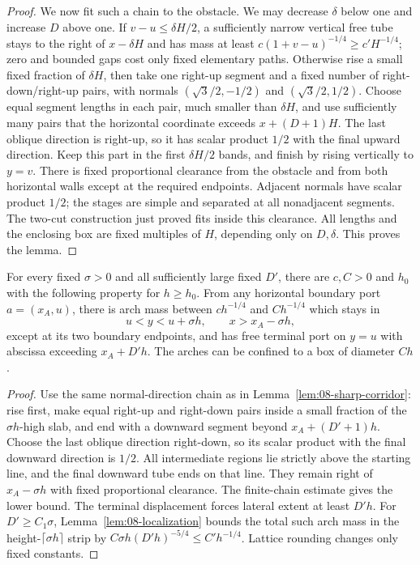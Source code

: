 \begin{proof}
We now fit such a chain to the obstacle. We may decrease $\delta$ below
one and increase $D$ above one. If $v-u\le\delta H/2$, a sufficiently
narrow vertical free tube stays to the right of $x-\delta H$ and has
mass at least $c(1+v-u)^{-1/4}\ge c'H^{-1/4}$; zero and bounded gaps
cost only fixed elementary paths. Otherwise rise a small fixed fraction
of $\delta H$, then take one right-up segment and a fixed number of right-down/right-up pairs, with normals
$(\sqrt3/2,-1/2)$ and $(\sqrt3/2,1/2)$. Choose equal segment lengths
in each pair, much smaller than $\delta H$, and use sufficiently many
pairs that the horizontal coordinate exceeds $x+(D+1)H$. The last
oblique direction is right-up, so it has scalar product $1/2$ with
the final upward direction. Keep this
part in the first $\delta H/2$ bands, and finish by rising vertically
to $y=v$. There is fixed proportional clearance from the obstacle and
from both horizontal walls except at the required endpoints. Adjacent
normals have scalar product $1/2$; the stages are simple and separated
at all nonadjacent segments. The two-cut construction just proved fits
inside this clearance. All lengths and the enclosing box are fixed
multiples of $H$, depending only on $D,\delta$. This proves the lemma.
\end{proof}

\begin{corollary}\label{lem:08-long-arch}
For every fixed $\sigma>0$ and all sufficiently large fixed $D'$, there
are $c,C>0$ and $h_0$ with the following property for $h\ge h_0$. From any horizontal boundary port $a=(x_A,u)$,
there is arch mass between $ch^{-1/4}$ and $Ch^{-1/4}$ which stays in
\[
 u<y<u+\sigma h,\qquad x>x_A-\sigma h,
\]
except at its two boundary endpoints, and has free terminal port on
$y=u$ with abscissa exceeding $x_A+D'h$. The arches can be confined
to a box of diameter $Ch$.
\end{corollary}
\begin{proof}
Use the same normal-direction chain as in
Lemma~\ref{lem:08-sharp-corridor}: rise first, make equal right-up and
right-down pairs inside a small fraction of the $\sigma h$-high slab,
and end with a downward segment beyond $x_A+(D'+1)h$. Choose the last
oblique direction right-down, so its scalar product with the final
downward direction is $1/2$. All intermediate regions lie strictly
above the starting line, and the final downward tube ends on that line.
They remain right of $x_A-\sigma h$ with fixed proportional clearance.
The finite-chain estimate gives the lower bound. The terminal
displacement forces lateral extent at least $D'h$. For
$D'\ge C_1\sigma$, Lemma~\ref{lem:08-localization} bounds the total
such arch mass in the height-$\lceil\sigma h\rceil$ strip by
$C\sigma h(D'h)^{-5/4}\le C'h^{-1/4}$. Lattice rounding changes only
fixed constants.
\end{proof}
